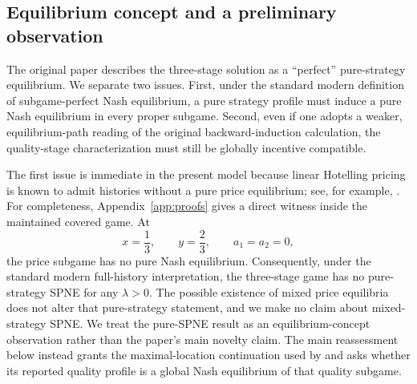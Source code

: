 \subsection{Equilibrium concept and a preliminary observation}\label{subsec:spne}

The original paper describes the three-stage solution as a ``perfect'' pure-strategy equilibrium. We separate two issues. First, under the standard modern definition of subgame-perfect Nash equilibrium, a pure strategy profile must induce a pure Nash equilibrium in every proper subgame. Second, even if one adopts a weaker, equilibrium-path reading of the original backward-induction calculation, the quality-stage characterization must still be globally incentive compatible.

The first issue is immediate in the present model because linear Hotelling pricing is known to admit histories without a pure price equilibrium; see, for example, \citet{DAspremontGabszewiczThisse1979}. For completeness, Appendix~\ref{app:proofs} gives a direct witness inside the maintained covered game. At
\[
 x=\frac13,\qquad y=\frac23,\qquad a_1=a_2=0,
\]
the price subgame has no pure Nash equilibrium. Consequently, under the standard modern full-history interpretation, the three-stage game has no pure-strategy SPNE for any $\lambda>0$. The possible existence of mixed price equilibria does not alter that pure-strategy statement, and we make no claim about mixed-strategy SPNE. We treat the pure-SPNE result as an equilibrium-concept observation rather than the paper's main novelty claim. The main reassessment below instead grants the maximal-location continuation used by \citet{Economides1989} and asks whether its reported quality profile is a global Nash equilibrium of that quality subgame.
